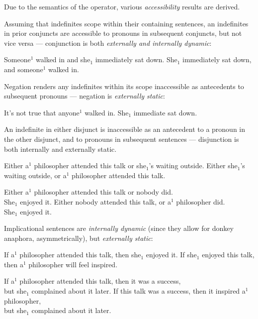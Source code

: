 \documentclass[nols,twoside,nofonts,nobib,nohyper]{tufte-handout}
\theoremstyle{observation}
\theoremstyle{theorem}
\theoremstyle{corollary}
\theoremstyle{definition}
\begin{document}
  Due to the semantics of the operator, various \textit{accessibility} results are derived.

  Assuming that indefinites scope within their containing sentences, an indefinites in prior conjuncts are accessible to pronouns in subsequent conjuncts, but not vice versa --- conjunction is both \textit{externally and internally dynamic}:

  \pex
  \a Someone$^{1}$ walked in and she$_{1}$ immediately sat down.
  \a\ljudge{\#}She$_{1}$ immediately sat down, and someone$^{1}$ walked in.
  \xe

  Negation renders any indefinites within its scope inaccessible as antecedents to subsequent pronouns --- negation is \textit{externally static}:

  \ex
  \ljudge{\#}It's not true that anyone$^{1}$ walked in. She$_{1}$ immediate sat down.
  \xe

  An indefinite in either disjunct is inaccessible as an antecedent to a pronoun in the other disjunct, and to pronouns in subsequent sentences --- disjunction is both internally and externally static.

  \pex
  \a \ljudge{\#}Either a$^{1}$ philosopher attended this talk or she$_{1}$'s waiting outside.
  \a \ljudge{\#}Either she$_{1}$'s waiting outside, or a$^{1}$ philosopher attended this talk.
  \xe

  \pex
  \a \ljudge{\#}Either a$^{1}$ philosopher attended this talk or nobody did.\\
  She$_{1}$ enjoyed it.
  \a\ljudge{\#}Either nobody attended this talk, or a$^{1}$ philosopher did.\\
  She$_{1}$ enjoyed it.
  \xe

  Implicational sentences are \textit{internally dynamic} (since they allow for donkey anaphora, asymmetrically), but \textit{externally static}:

  \pex
  \a If a$^{1}$ philosopher attended this talk, then she$_{1}$ enjoyed it.
  \a\ljudge{\#}If she$_{1}$ enjoyed this talk, then a$^{1}$ philosopher will feel inspired.
  \xe

  \pex
  \a\ljudge{\#}If a$^{1}$ philosopher attended this talk, then it was a success,\\
  but she$_{1}$ complained about it later.
  \a\ljudge{\#}If this talk was a success, then it inspired a$^{1}$ philosopher,\\
  but she$_{1}$ complained about it later.
  \xe
\end{document}

